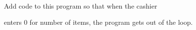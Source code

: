 Add code to this program so that when the cashier

enters 0 for number of items, the program gets out of the loop.

